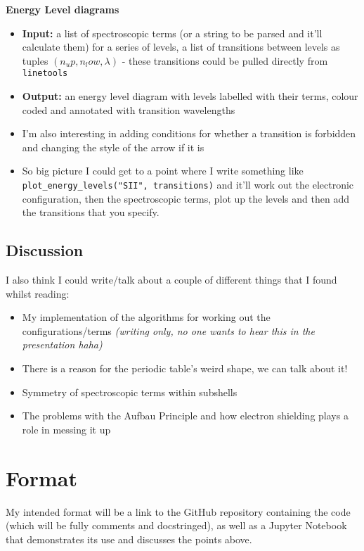 \documentclass[12pt, letterpaper, twoside]{article}
\begin{document}
\noindent \textbf{Energy Level diagrams}
\begin{itemize}
    \item \textbf{Input:} a list of spectroscopic terms (or a string to be parsed and it'll calculate them) for a series of levels, a list of transitions between levels as tuples $(n_up, n_low, \lambda)$ - these transitions could be pulled directly from \texttt{linetools}
    \item \textbf{Output:} an energy level diagram with levels labelled with their terms, colour coded and annotated with transition wavelengths
    \item I'm also interesting in adding conditions for whether a transition is forbidden and changing the style of the arrow if it is
    \item So big picture I could get to a point where I write something like \texttt{plot\_energy\_levels("SII", transitions)} and it'll work out the electronic configuration, then the spectroscopic terms, plot up the levels and then add the transitions that you specify.
\end{itemize}

\subsection{Discussion}

I also think I could write/talk about a couple of different things that I found whilst reading:
\begin{itemize}
    \item My implementation of the algorithms for working out the configurations/terms \emph{(writing only, no one wants to hear this in the presentation haha)}
    \item There is a reason for the periodic table's weird shape, we can talk about it!
    \item Symmetry of spectroscopic terms within subshells
    \item The problems with the Aufbau Principle and how electron shielding plays a role in messing it up
\end{itemize}

\section{Format}
My intended format will be a link to the GitHub repository containing the code (which will be fully comments and docstringed), as well as a Jupyter Notebook that demonstrates its use and discusses the points above.
\end{document}
